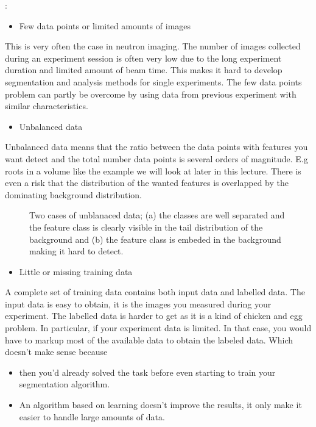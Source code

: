 \documentclass[letterpaper,10pt,english]{sphinxmanual}
\begin{document}
:
\begin{itemize}
\item {} 
Few data points or limited amounts of images

\end{itemize}

This is very often the case in neutron imaging. The number of images collected during an experiment session is often very low due to the long experiment duration and limited amount of beam time. This makes it hard to develop segmentation and analysis methods for single experiments. The few data points problem can partly be overcome by using data from previous experiment with similar characteristics.
\begin{itemize}
\item {} 
Unbalanced data

\end{itemize}

Unbalanced data means that the ratio between the data points with features you want detect and the total number data points is several orders of magnitude. E.g roots in a volume like the example we will look at later in this lecture. There is even a risk that the distribution of the wanted features is overlapped by the dominating background distribution.

\begin{figure}[htbp]
\centering
\capstart

\noindent{}
\caption{Two cases of unblanaced data; (a) the classes are well separated and the feature class is clearly visible in the tail distribution of the background and (b) the feature class is embeded in the background making it hard to detect.}\label{\detokenize{ML4NeutronImageSegmentation:id9}}\end{figure}


\begin{itemize}
\item {} 
Little or missing training data

\end{itemize}

A complete set of training data contains both input data and labelled data. The input data is easy to obtain, it is the images you measured during your experiment. The labelled data is harder to get as it is a kind of chicken and egg problem. In particular, if your experiment data is limited. In that case, you would have to mark\sphinxhyphen{}up most of the available data to obtain the labeled data. Which doesn’t make sense because
\begin{itemize}
\item {} 
then you’d already solved the task before even starting to train your segmentation algorithm.

\item {} 
An algorithm based on learning doesn’t improve the results, it only make it easier to handle large amounts of data.

\end{itemize}
\end{document}

